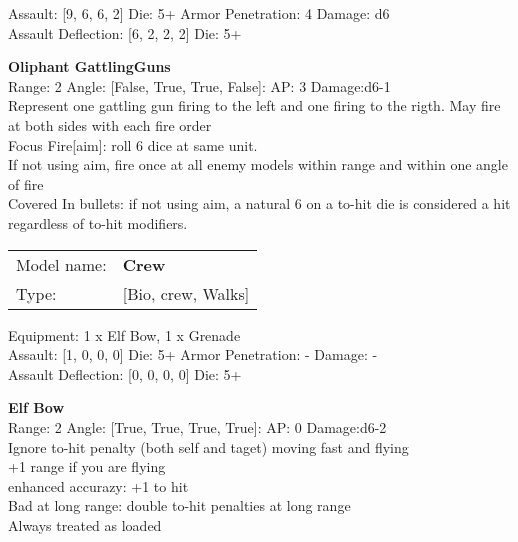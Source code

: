 Assault: [9, 6, 6, 2] Die: 5+ Armor Penetration: 4 Damage: d6 \\
Assault Deflection: [6, 2, 2, 2] Die: 5+\\
\indent  



{\bf Oliphant GattlingGuns } \\



Range: 2  Angle: [False, True, True, False]: AP: 3 Damage:d6-1 \\
Represent one gattling gun firing to the left and one firing to the rigth. May fire at both sides with each fire order\\ 
Focus Fire[aim]: roll 6 dice at same unit.\\ 
If not using aim, fire once at all enemy models within range and within one angle of fire\\ 
Covered In bullets: if not using aim, a natural 6 on a to-hit die is considered a hit regardless of to-hit modifiers.\\ 




 



\begin{tabular}{ll}
Model name: & {\bf Crew } \\
Type: & [Bio, crew, Walks] \\
\end{tabular}

Equipment: 1 x Elf Bow, 1 x Grenade \\

Assault: [1, 0, 0, 0] Die: 5+ Armor Penetration: - Damage: - \\
Assault Deflection: [0, 0, 0, 0] Die: 5+\\
\indent  



{\bf Elf Bow } \\



Range: 2  Angle: [True, True, True, True]: AP: 0 Damage:d6-2 \\
Ignore to-hit penalty (both self and taget) moving fast and flying\\ 
+1 range if you are flying\\ 
enhanced accurazy: +1 to hit\\ 
Bad at long range: double to-hit penalties at long range\\ 
Always treated as loaded\\ 




